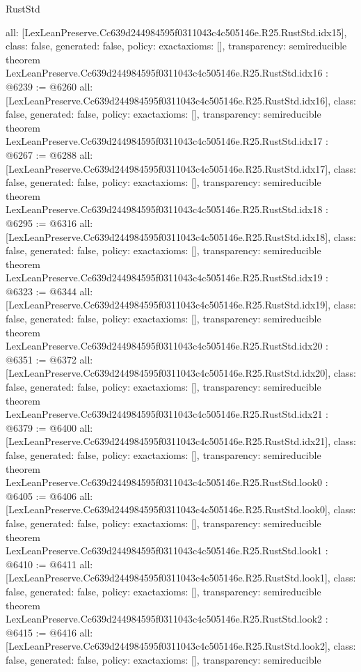 \begin{lexlean}{RustStd}
\begin{coremodule}
{  all: [LexLeanPreserve.Cc639d244984595f0311043c4c505146e.R25.RustStd.idx15],
  class: false,
  generated: false,
  policy: exact{axioms: []},
  transparency: semireducible
}
theorem LexLeanPreserve.Cc639d244984595f0311043c4c505146e.R25.RustStd.idx16 : @6239 := @6260 {
  all: [LexLeanPreserve.Cc639d244984595f0311043c4c505146e.R25.RustStd.idx16],
  class: false,
  generated: false,
  policy: exact{axioms: []},
  transparency: semireducible
}
theorem LexLeanPreserve.Cc639d244984595f0311043c4c505146e.R25.RustStd.idx17 : @6267 := @6288 {
  all: [LexLeanPreserve.Cc639d244984595f0311043c4c505146e.R25.RustStd.idx17],
  class: false,
  generated: false,
  policy: exact{axioms: []},
  transparency: semireducible
}
theorem LexLeanPreserve.Cc639d244984595f0311043c4c505146e.R25.RustStd.idx18 : @6295 := @6316 {
  all: [LexLeanPreserve.Cc639d244984595f0311043c4c505146e.R25.RustStd.idx18],
  class: false,
  generated: false,
  policy: exact{axioms: []},
  transparency: semireducible
}
theorem LexLeanPreserve.Cc639d244984595f0311043c4c505146e.R25.RustStd.idx19 : @6323 := @6344 {
  all: [LexLeanPreserve.Cc639d244984595f0311043c4c505146e.R25.RustStd.idx19],
  class: false,
  generated: false,
  policy: exact{axioms: []},
  transparency: semireducible
}
theorem LexLeanPreserve.Cc639d244984595f0311043c4c505146e.R25.RustStd.idx20 : @6351 := @6372 {
  all: [LexLeanPreserve.Cc639d244984595f0311043c4c505146e.R25.RustStd.idx20],
  class: false,
  generated: false,
  policy: exact{axioms: []},
  transparency: semireducible
}
theorem LexLeanPreserve.Cc639d244984595f0311043c4c505146e.R25.RustStd.idx21 : @6379 := @6400 {
  all: [LexLeanPreserve.Cc639d244984595f0311043c4c505146e.R25.RustStd.idx21],
  class: false,
  generated: false,
  policy: exact{axioms: []},
  transparency: semireducible
}
theorem LexLeanPreserve.Cc639d244984595f0311043c4c505146e.R25.RustStd.look0 : @6405 := @6406 {
  all: [LexLeanPreserve.Cc639d244984595f0311043c4c505146e.R25.RustStd.look0],
  class: false,
  generated: false,
  policy: exact{axioms: []},
  transparency: semireducible
}
theorem LexLeanPreserve.Cc639d244984595f0311043c4c505146e.R25.RustStd.look1 : @6410 := @6411 {
  all: [LexLeanPreserve.Cc639d244984595f0311043c4c505146e.R25.RustStd.look1],
  class: false,
  generated: false,
  policy: exact{axioms: []},
  transparency: semireducible
}
theorem LexLeanPreserve.Cc639d244984595f0311043c4c505146e.R25.RustStd.look2 : @6415 := @6416 {
  all: [LexLeanPreserve.Cc639d244984595f0311043c4c505146e.R25.RustStd.look2],
  class: false,
  generated: false,
  policy: exact{axioms: []},
  transparency: semireducible
}
\end{coremodule}
\end{lexlean}
